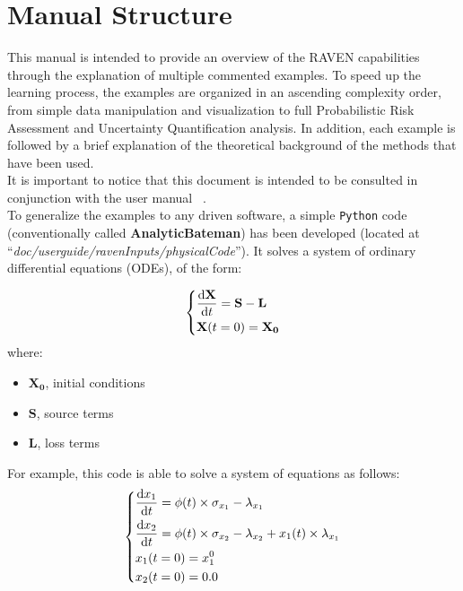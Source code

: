 \section{Manual Structure}
This manual is intended to provide an overview of the RAVEN capabilities through the explanation of multiple commented examples.
To speed up the learning process, the examples are organized in an ascending complexity order, from simple data manipulation and visualization to
full Probabilistic Risk Assessment and Uncertainty Quantification analysis. In addition, each example is followed by a brief explanation of the theoretical background of the methods that have been used.
\\ It is important to notice that this document is intended to be consulted in conjunction with the user manual ~\cite{RAVENuserManual}.
\\To generalize the examples to any driven software, a simple \texttt{Python} code (conventionally called \textbf{AnalyticBateman}) has been developed (located at ``\textit{doc/user\textunderscore guide/ravenInputs/physicalCode}''). It solves a system of ordinary differential equations (ODEs), of the form:

\begin{equation}
\begin{dcases}
\frac{\mathrm{d} \mathbf{X}}{\mathrm{d} t} = \mathbf{S}-\mathbf{L} \\
 \mathbf{X}(t=0)= \mathbf{X_{0}}
\end{dcases}
\end{equation}
   where:
  \begin{itemize}
     \item $\mathbf{X_{0}}$, initial conditions
     \item $\mathbf{S}$, source terms
     \item $\mathbf{L}$, loss terms
   \end{itemize}

For example, this  code is able to solve a system of equations as follows:
\begin{equation}
  \begin{dcases}
   \frac{\mathrm{d} x_{1}}{\mathrm{d} t} = \phi (t)\times \sigma_{x_{1}}-\lambda_{x_{1}} \\
   \frac{\mathrm{d} x_{2}}{\mathrm{d} t} = \phi (t)\times \sigma_{x_{2}}-\lambda_{x_{2}}+x_{1}(t)\times\lambda_{x_{1}} \\
    x_{1}(t=0)= x_{1}^{0} \\
    x_{2}(t=0)= 0.0
  \end{dcases}
\end{equation}

